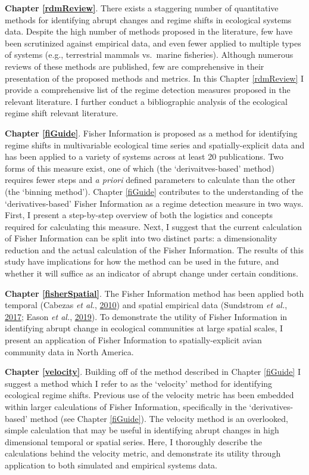 \documentclass[print]{nuthesis}
\begin{document}
\textbf{Chapter \ref{rdmReview}}. There exists a staggering number of quantitative methods for identifying abrupt changes and regime shifts in ecological systems data. Despite the high number of methods proposed in the literature, few have been scrutinized against empirical data, and even fewer applied to multiple types of systems (e.g., terrestrial mammals vs.~marine fisheries). Although numerous reviews of these methods are published, few are comprehensive in their presentation of the proposed methods and metrics. In this Chapter \ref{rdmReview} I provide a comprehensive list of the regime detection measures proposed in the relevant literature. I further conduct a bibliographic analysis of the ecological regime shift relevant literature.

\textbf{Chapter \ref{fiGuide}}. Fisher Information is proposed as a method for identifying regime shifts in multivariable ecological time series and spatially-explicit data and has been applied to a variety of systems across at least 20 publications. Two forms of this measure exist, one of which (the `derivaitves-based' method) requires fewer steps and \emph{a priori} defined parameters to calculate than the other (the `binning method'). Chapter \ref{fiGuide} contributes to the understanding of the `derivatives-based' Fisher Information as a regime detection measure in two ways. First, I present a step-by-step overview of both the logistics and concepts required for calculating this measure. Next, I suggest that the current calculation of Fisher Information can be split into two distinct parts: a dimensionality reduction and the actual calculation of the Fisher Information. The results of this study have implications for how the method can be used in the future, and whether it will suffice as an indicator of abrupt change under certain conditions.

\textbf{Chapter \ref{fisherSpatial}}. The Fisher Information method has been applied both temporal (Cabezas \emph{et al.}, \protect\hyperlink{ref-cabezas_san_2010}{2010}) and spatial empirical data (Sundstrom \emph{et al.}, \protect\hyperlink{ref-sundstrom2017detecting}{2017}; Eason \emph{et al.}, \protect\hyperlink{ref-eason2019information}{2019}). To demonstrate the utility of Fisher Information in identifying abrupt change in ecological communities at large spatial scales, I present an application of Fisher Information to spatially-explicit avian community data in North America.

\textbf{Chapter \ref{velocity}}. Building off of the method described in Chapter \ref{fiGuide} I suggest a method which I refer to as the `velocity' method for identifying ecological regime shifts. Previous use of the velocity metric has been embedded within larger calculations of Fisher Information, specifically in the `derivatives-based' method (see Chapter \ref{fiGuide}). The velocity method is an overlooked, simple calculation that may be useful in identifying abrupt changes in high dimensional temporal or spatial series. Here, I thoroughly describe the calculations behind the velocity metric, and demonstrate its utility through application to both simulated and empirical systems data.
\end{document}
